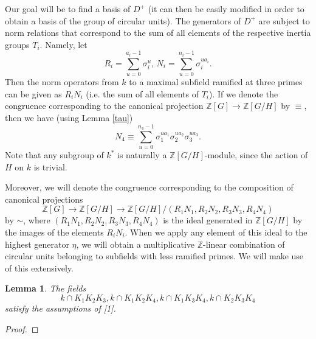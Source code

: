 \documentclass[12pt,a4paper]{article}
\newtheorem{lemma}[theorem]{Lemma}
\theoremstyle{definition}
\newcommand{\Z}{\mathbb{Z}}
\begin{document}


Our goal will be to find a basis of $D^+$ (it can then be easily modified in order to obtain a basis of the group of circular units). The generators of $D^+$ are subject to norm relations that correspond to the sum of all elements of the respective inertia groups $T_i$. Namely, let $$R_i=\sum_{u=0}^{a_i-1}\sigma_i^u,\, N_i=\sum_{u=0}^{n_i-1}\sigma_i^{ua_i}.$$ 
Then the norm operators from $k$ to a maximal subfield ramified at three primes can be given as $R_iN_i$ (i.e. the sum of all elements of $T_i$). If we denote the congruence corresponding to the canonical projection $\Z[G]\to \Z[G/H]$ by $\equiv$, then we have (using Lemma \ref{tau}) $$N_4\equiv \sum_{u=0}^{n_4-1}\sigma_1^{ua_1}\sigma_2^{ua_2}\sigma_3^{ua_3}.$$ Note that any subgroup of $k^*$ is naturally a $\Z[G/H]$-module, since the action of $H$ on $k$ is trivial.

Moreover, we will denote the congruence corresponding to the composition of canonical projections $$\Z[G]\to \Z[G/H]\to \Z[G/H]/(R_1N_1,R_2N_2,R_3N_3,R_4N_4)$$ by $\sim$, where $(R_1N_1,R_2N_2,R_3N_3,R_4N_4)$ is the ideal generated in $\Z[G/H]$ by the images of the elements $R_iN_i$. When we apply any element of this ideal to the highest generator $\eta$, we will obtain a multiplicative $\Z$-linear combination of circular units belonging to subfields with less ramified primes. We will make use of this extensively.

\begin{lemma}
The fields $$k\cap K_1K_2K_3,k\cap K_1K_2K_4,k\cap K_1K_3K_4,k\cap K_2K_3K_4$$ satisfy the assumptions of [1].
\end{lemma}
\begin{proof}
\end{proof}
\end{document}
